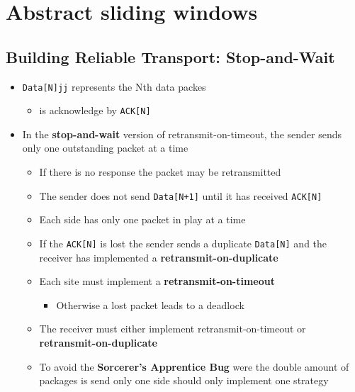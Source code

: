 \documentclass[11pt]{article}
\providecommand{\tightlist}{%
      \setlength{\itemsep}{0pt}\setlength{\parskip}{0pt}}
\begin{document}
    \section{Abstract sliding windows}\label{abstract-sliding-windows}

    \subsection{Building Reliable Transport:
Stop-and-Wait}\label{building-reliable-transport-stop-and-wait}

\begin{itemize}
\tightlist
\item
  \texttt{Data{[}N{]}jj} represents the Nth data packes

  \begin{itemize}
  \tightlist
  \item
    is acknowledge by \texttt{ACK{[}N{]}}
  \end{itemize}
\item
  In the \textbf{stop-and-wait} version of retransmit-on-timeout, the
  sender sends only one outstanding packet at a time

  \begin{itemize}
  \tightlist
  \item
    If there is no response the packet may be retransmitted
  \item
    The sender does not send \texttt{Data{[}N+1{]}} until it has
    received \texttt{ACK{[}N{]}}
  \item
    Each side has only one packet in play at a time
  \item
    If the \texttt{ACK{[}N{]}} is lost the sender sends a duplicate
    \texttt{Data{[}N{]}} and the receiver has implemented a
    \textbf{retransmit-on-duplicate}
  \item
    Each site must implement a \textbf{retransmit-on-timeout}

    \begin{itemize}
    \tightlist
    \item
      Otherwise a lost packet leads to a deadlock
    \end{itemize}
  \item
    The receiver must either implement retransmit-on-timeout or
    \textbf{retransmit-on-duplicate}
  \item
    To avoid the \textbf{Sorcerer's Apprentice Bug} were the double
    amount of packages is send only one side should only implement one
    strategy


\end{itemize}
\end{itemize}
\end{document}
